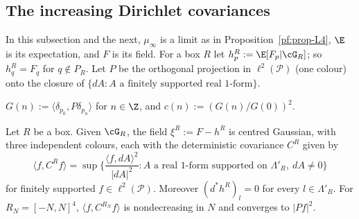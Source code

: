 \subsection{The increasing Dirichlet covariances}\label{pf:sec-D}

In this subsection and the next, $\mu_\infty$ is a limit as in Proposition~\ref{pf:prop-L4}, $\E$ is its expectation, and $F$ is its field. For a box $R$ let $h^R_p:=\E[F_p|\cG_R]$; so $h^R_q=F_q$ for $q\notin P_R$.
Let $P$ be the orthogonal projection in $\ell^2(\mathcal P)$ (one colour) onto the closure of $\{dA:A\text{ a finitely supported real }1\text{-form}\}$.

\begin{definition}\label{pf:def-G}
$G(n):=\langle\delta_{p_0},P\delta_{p_n}\rangle$ for $n\in\Z$, and $c(n):=(G(n)/G(0))^2$.
\end{definition}

\begin{lemma}\label{pf:lem-D}
Let $R$ be a box. Given $\cG_R$, the field $\xi^R:=F-h^R$ is centred Gaussian, with three independent colours, each with the deterministic covariance $C^R$ given by
\begin{equation}\label{pf:eq-CR}
\langle f,C^Rf\rangle=\sup\Big\{\frac{\langle f,dA\rangle^2}{|dA|^2}:A\text{ a real }1\text{-form supported on }\Lambda'_R,\ dA\ne0\Big\}
\end{equation}
for finitely supported $f\in\ell^2(\mathcal P)$. Moreover $(d^*h^R)_l=0$ for every $l\in\Lambda'_R$. For $R_N=[-N,N]^4$, $\langle f,C^{R_N}f\rangle$ is nondecreasing in $N$ and converges to $|Pf|^2$.
\end{lemma}

